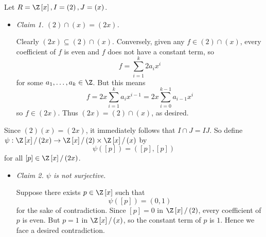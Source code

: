 \documentclass[pmath347]{subfiles}
\begin{document}
    \ex Let $R=\Z\left[ x \right] , I = \left( 2 \right) , J = \left( x \right)$. 
    \begin{itemize}
        \item \textit{Claim 1. $\left( 2 \right) \cap \left( x \right) = \left( 2x \right)$.}

            \begin{subproof}
                Clearly $\left( 2x \right) \subseteq \left( 2 \right)\cap\left( x \right)$. Conversely, given any $f\in \left( 2 \right) \cap \left( x \right)$, every coefficient of $f$ is even and $f$ does not have a constant term, so
                \begin{equation*}
                    f = \sum^{k}_{i=1} 2a_ix^i
                \end{equation*}
                for some $a_1,\ldots,a_k\in\Z$. But this means
                \begin{equation*}
                    f = 2x \sum^{k}_{i=1} a_ix^{i-1} = 2x\sum^{k-1}_{i=0} a_{i-1}x^i
                \end{equation*}
                so $f\in \left( 2x \right)$. Thus $\left( 2x \right) = \left( 2 \right) \cap \left( x \right)$, as desired.
            \end{subproof}
    \end{itemize} 
    Since $\left( 2 \right) \left( x \right) = \left( 2x \right)$, it immediately follows that $I\cap J=IJ$. So define $\psi:\Z\left[ x \right] /\left( 2x \right) \to \Z\left[ x \right] /\left( 2 \right) \times \Z\left[ x \right] /\left( x \right) $ by
    \begin{equation*}
        \psi\left( \left[ p \right]  \right) = \left( \left[ p \right] , \left[ p \right]  \right) 
    \end{equation*}
    for all $\left[ p \right] \in \Z\left[ x \right] /\left( 2x \right)$.
    \begin{itemize}
        \item \textit{Claim 2. $\psi$ is not surjective.}

            \begin{subproof}
                Suppose there exists $p\in\Z\left[ x \right]$ such that
                \begin{equation*}
                    \psi\left( \left[ p \right]  \right) = \left( 0, 1 \right) 
                \end{equation*}
                for the sake of contradiction. Since $\left[ p \right] = 0$ in $\Z\left[ x \right] /\left( 2 \right)$, every coefficient of $p$ is even. But $p = 1$ in $\Z\left[ x \right] /\left( x \right)$, so the constant term of $p$ is $1$. Hence we face a desired contradiction.
            \end{subproof}
    \end{itemize} 
\end{document}

